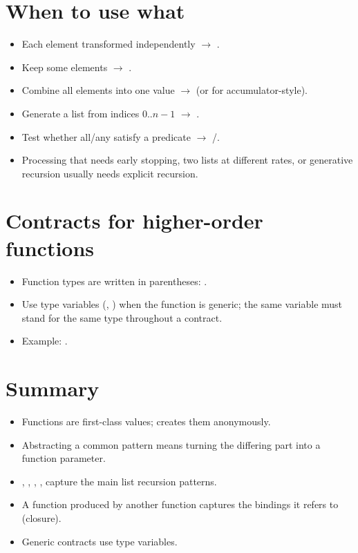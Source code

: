 \section{When to use what}
\begin{itemize}
  \item Each element transformed independently $\to$ .
  \item Keep some elements $\to$ .
  \item Combine all elements into one value $\to$  (or  for accumulator-style).
  \item Generate a list from indices $0..n-1$ $\to$ .
  \item Test whether all/any satisfy a predicate $\to$ /.
  \item Processing that needs early stopping, two lists at different rates, or generative recursion usually needs explicit recursion.
\end{itemize}

\section{Contracts for higher-order functions}
\begin{itemize}
  \item Function types are written in parentheses: .
  \item Use type variables (, ) when the function is generic; the same variable must stand for the same type throughout a contract.
  \item Example: .
\end{itemize}

\section{Summary}
\begin{itemize}
  \item Functions are first-class values;  creates them anonymously.
  \item Abstracting a common pattern means turning the differing part into a function parameter.
  \item {}, , , ,  capture the main list recursion patterns.
  \item A function produced by another function captures the bindings it refers to (closure).
  \item Generic contracts use type variables.
\end{itemize}
